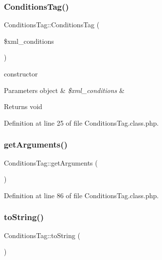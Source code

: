 \subsubsection{\texorpdfstring{Conditions\+Tag()}{ConditionsTag()}}
{\footnotesize\ttfamily Conditions\+Tag\+::\+Conditions\+Tag (\begin{DoxyParamCaption}\item[{}]{\$xml\+\_\+conditions }\end{DoxyParamCaption})}

constructor 
\begin{DoxyParams}[1]{Parameters}
object & {\em \$xml\+\_\+conditions} & \\
\hline
\end{DoxyParams}
\begin{DoxyReturn}{Returns}
void 
\end{DoxyReturn}


Definition at line 25 of file Conditions\+Tag.\+class.\+php.

\hypertarget{classConditionsTag_a8c7e8f873db4fa6e6c35920bed31afae}{}\label{classConditionsTag_a8c7e8f873db4fa6e6c35920bed31afae} 
\subsubsection{\texorpdfstring{get\+Arguments()}{getArguments()}}
{\footnotesize\ttfamily Conditions\+Tag\+::get\+Arguments (\begin{DoxyParamCaption}{ }\end{DoxyParamCaption})}



Definition at line 86 of file Conditions\+Tag.\+class.\+php.

\hypertarget{classConditionsTag_af458fe76fa1ffb006306c682e024ee5a}{}\label{classConditionsTag_af458fe76fa1ffb006306c682e024ee5a} 
\subsubsection{\texorpdfstring{to\+String()}{toString()}}
{\footnotesize\ttfamily Conditions\+Tag\+::to\+String (\begin{DoxyParamCaption}{ }\end{DoxyParamCaption})}

